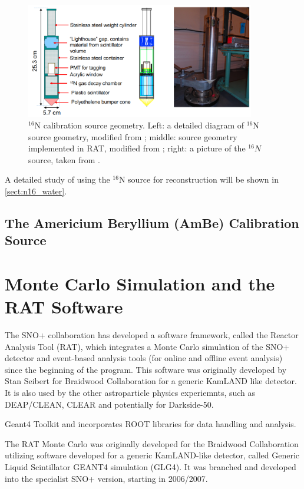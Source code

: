 \begin{figure}[!htb]
	\centering
	\includegraphics[width=10cm]{n16geom.png}
	\caption{$^{16}$N calibration source geometry. Left: a detailed diagram of $^{16}$N source geometry, modified from \cite{maclellan2009energy,matt_deployedsource}; middle: source geometry implemented in RAT, modified from \cite{n16geom_zach}; right: a picture of the $^{16}N$ source, taken from \cite{n16pic}.}
	\label{n16pic}
\end{figure}


A detailed study of using the $^{16}$N source for reconstruction will be shown in \ref{sect:n16_water}.


\subsection{The Americium Beryllium (AmBe) Calibration Source}






\section{Monte Carlo Simulation and the RAT Software}
The SNO+ collaboration has developed a software framework, called the Reactor Analysis
Tool (RAT), which integrates a Monte Carlo simulation of the SNO+ detector and event-based analysis tools (for online and offline event analysis) since the beginning of the program. This software was originally developed by Stan Seibert for Braidwood Collaboration for a generic KamLAND like detector. It is also used by the other astroparticle physics experiemnts, such as DEAP/CLEAN, CLEAR and potentially for Darkside-50\cite{rat}.

Geant4 Toolkit and
incorporates ROOT libraries for data handling and analysis.

The RAT Monte Carlo was originally developed for the Braidwood Collaboration
utilizing software developed for a generic KamLAND-like detector, called Generic Liquid Scintillator GEANT4 simulation (GLG4). It was branched and
developed into the specialist SNO+ version, starting in 2006/2007.

